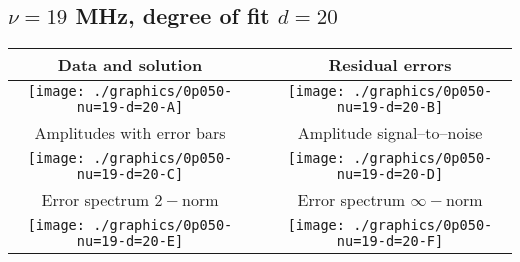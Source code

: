 

% 

\clearpage{}
\break{}

\subsection{$\nu = 19$ MHz, degree of fit $d = 20$}

\begin{table}[h]
    \begin{center}
        \begin{tabular}{ccc}
            Data and solution & \quad & Residual errors \\\hline
            \texttt{[image: ./graphics/0p050-nu=19-d=20-A]} &&
            \texttt{[image: ./graphics/0p050-nu=19-d=20-B]} \\[15pt]
            Amplitudes with error bars && Amplitude signal--to--noise \\\hline
            \texttt{[image: ./graphics/0p050-nu=19-d=20-C]} &&
            \texttt{[image: ./graphics/0p050-nu=19-d=20-D]} \\[15pt]
            Error spectrum $2-$norm && Error spectrum $\infty-$norm \\\hline
            \texttt{[image: ./graphics/0p050-nu=19-d=20-E]} &&
            \texttt{[image: ./graphics/0p050-nu=19-d=20-F]} \\[15pt]
        \end{tabular}
    \end{center}
\label{fig:elev=50, nu=19}
\end{table}



\endinput
